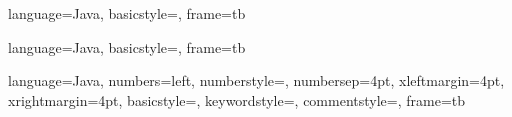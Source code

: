 
\usepackage[utf8]{inputenc}
\usepackage{helvet}
\usepackage[T1]{fontenc}
\usepackage{amsmath, amsthm, amssymb}
\usepackage{graphicx}
\usepackage{listings}
\usepackage{hyperref}
\usepackage{KITcolors}
\renewcommand{\rmdefault}{phv}
\newlength{\movetitlegrafics}
\setlength{\movetitlegrafics}{0.0\paperwidth}
%
\setcounter{ctlit}{1}%

\newcommand\BLUE[1]{\textcolor{KITblue}{#1}}%
\newcommand\BLACK[1]{\textcolor{KITblack}{#1}}%
\newcommand\GREEN[1]{\textcolor{KITgreen}{#1}}%
\newcommand\LBLUE[1]{\textcolor{KITblue15}{#1}}%
\newcommand\RED[1]{\textcolor{KITred}{#1}}%
\def\cmt#1{\BLUE{#1}}%
\def\code#1{\texttt{#1}}%
\def\codeblock#1{\GREEN{\texttt{#1}}}%
\def\ftext#1{\textbf{{#1}}}%
\def\headline#1{\large\textbf{\GREEN{#1}}}%
\def\KITitem{\KITBullet[2mm]\ }%
\def\q{\quad}%
\def\qq{\qquad}%
\def\subtitle#1{{\small #1}}%
\def\tab{\hspace*{0.5cm}}%
\def\bs{$\backslash$}%
\def\hpm{\hphantom{$-$}}%
\def\meps{\epsilon}%

{
  language=Java,
  basicstyle=\ttfamily, %
  frame=tb  %
}

{
  language=Java,
  basicstyle=\small\ttfamily, %
  frame=tb  %
}

{
  language=Java,
  numbers=left,
  numberstyle=\color{KITblack50}\ttfamily,
  numbersep=4pt, %
  xleftmargin=4pt, %
  xrightmargin=4pt, %
  basicstyle=\ttfamily, %
  keywordstyle=\color{KITgreen},  %
  commentstyle=\color{KITblue}\ttfamily, %
  frame=tb  %
}

